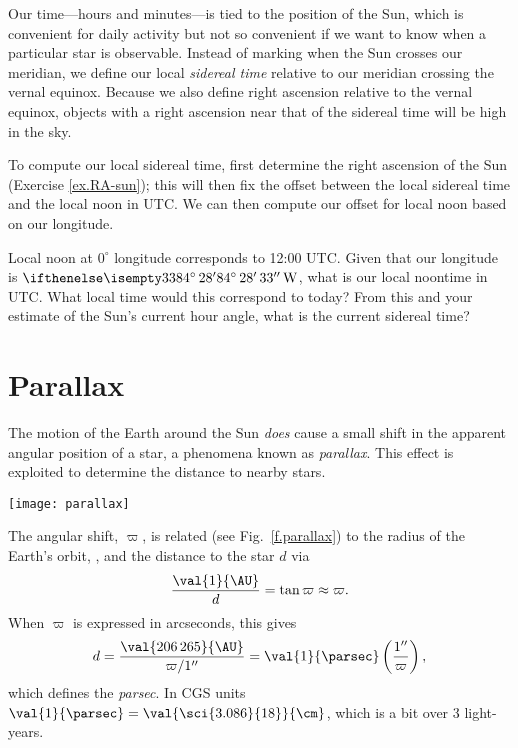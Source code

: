 Our time---hours and minutes---is tied to the position of the Sun, which is convenient for daily activity but not so convenient if we want to know when a particular star is observable.  Instead of marking when the Sun crosses our meridian, we define our local \emph{sidereal time} relative to our meridian crossing the vernal equinox.  Because we also define right ascension relative to the vernal equinox, objects with a right ascension near that of the sidereal time will be high in the sky.

To compute our local sidereal time, first determine the right ascension of the Sun (Exercise \ref{ex.RA-sun}); this will then fix the offset between the local sidereal time and the local noon in UTC.  We can then compute our offset for local noon based on our longitude.

\begin{exercisebox}
Local noon at $0^{\circ}$ longitude corresponds to 12:00 UTC. Given that our longitude is $\dec{84}{28}{33}\,\mathrm{W}$, what is our local noontime in UTC.  What local time would this correspond to today? From this and your estimate of the Sun's current hour angle, what is the current sidereal time?
\end{exercisebox}

\section{Parallax}

The motion of the Earth around the Sun \emph{does} cause a small shift in the apparent angular position of a star, a phenomena known as \emph{parallax}.  This effect is exploited to determine the distance to nearby stars.  

\begin{figure*}[htb]
\texttt{[image: parallax]}
\caption[The parallax angle of a star]{The parallax angle $\varpi$ of a star induced by Earth's motion around the Sun.}
\label{f.parallax}
\end{figure*}

The angular shift, $\varpi$, is related (see Fig.~\ref{f.parallax}) to the radius of the Earth's orbit, , and the distance to the star $d$ via
\[
\frac{\val{1}{\AU}}{d} = \tan\varpi \approx \varpi.
\]
When $\varpi$ is expressed in arcseconds, this gives
\begin{equation}\label{e.parallax}
d = \frac{\val{206\,265}{\AU}}{\varpi/1''} = \val{1}{\parsec}\left(\frac{1''}{\varpi}\right) ,
\end{equation}
which defines the \emph{parsec}.  In CGS units $\val{1}{\parsec} = \val{\sci{3.086}{18}}{\cm}$, which is a bit over 3 light-years.

